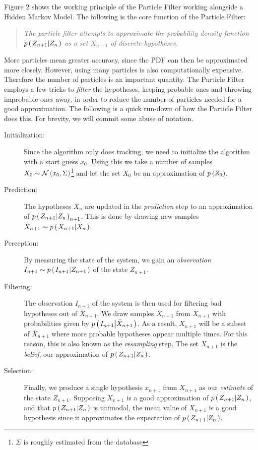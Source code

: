 Figure 2 shows the working principle of the Particle Filter working alongside a Hidden Markov Model. The following is the core function of the Particle Filter:

\begin{quote}
  \emph{The particle filter attempts to approximate the probability density function $p\left(\left. Z_{n+1} \middle\vert Z_n \right.\right)$ as a set $X_{n+1}$ of discrete hypotheses.}
\end{quote}

More particles mean greater accuracy, since the PDF can then be approximated more closely. However, using many particles is also computationally expensive. Therefore the number of particles is an important quantity. The Particle Filter employs a few tricks to \emph{filter} the hypotheses, keeping probable ones and throwing improbable ones away, in order to reduce the number of particles needed for a good approximation. The following is a quick run-down of how the Particle Filter does this. For brevity, we will commit some abuse of notation.

\begin{description}
\item[Initialization:] Since the algorithm only does tracking, we need to initialize the algorithm with a start guess $x_0$. Using this we take a number of samples $X_0 \sim \mathcal{N}\left(x_0, \Sigma\right)$\footnote{$\Sigma$ is roughly estimated from the database} and let the set $X_0$ be an approximation of $p\left(Z_0\right)$.
\item[Prediction:] The hypotheses $X_n$ are updated in the \emph{prediction} step to an approximation of $p\left(\left. Z_{n+1} \middle\vert Z_n \right.\right)_{n+1}$. This is done by drawing new samples $\bar{X}_{n+1} \sim p\left(\left. X_{n+1} \middle\vert X_n \right.\right)$.
\item[Perception:] By measuring the state of the system, we gain an \emph{observation} $I_{n+1} \sim p\left(\left. I_{n+1} \middle\vert Z_{n+1} \right.\right)$ of the state $Z_{n+1}$.
\item[Filtering:] The observation $I_{n+1}$ of the system is then used for filtering bad hypotheses out of $\bar{X}_{n+1}$. We draw samples $X_{n+1}$ from $\bar{X}_{n+1}$ with probabilities given by $p\left(\left. I_{n+1} \middle\vert \bar{X}_{n+1} \right.\right)$. As a result, $X_{n+1}$ will be a subset of $\bar{X}_{n+1}$ where more probable hypotheses appear multiple times. For this reason, this is also known as the \emph{resampling} step. The set $X_{n+1}$ is the \emph{belief}, our approximation of $p\left(\left. Z_{n+1} \middle\vert Z_n \right.\right)$.
\item[Selection:] Finally, we produce a single hypothesis $x_{n+1}$ from $X_{n+1}$ as our \emph{estimate} of the state $Z_{n+1}$. Supposing $X_{n+1}$ is a good approximation of $p\left(\left. Z_{n+1} \middle\vert Z_n \right.\right)$, and that $p\left(\left. Z_{n+1} \middle\vert Z_n \right.\right)$ is unimodal, the mean value of $X_{n+1}$ is a good hypothesis since it approximates the expectation of $p\left(\left. Z_{n+1} \middle\vert Z_n \right.\right)$.
\end{description}


